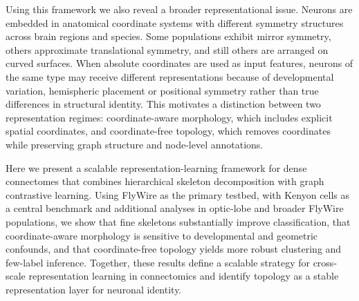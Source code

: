 \documentclass{article}
\begin{document}
Using this framework we also reveal a broader representational issue. Neurons are embedded in anatomical coordinate systems with different symmetry structures across brain regions and species. Some populations exhibit mirror symmetry, others approximate translational symmetry, and still others are arranged on curved surfaces. When absolute coordinates are used as input features, neurons of the same type may receive different representations because of developmental variation, hemispheric placement or positional symmetry rather than true differences in structural identity. This motivates a distinction between two representation regimes: coordinate-aware morphology, which includes explicit spatial coordinates, and coordinate-free topology, which removes coordinates while preserving graph structure and node-level annotations.


Here we present a scalable representation-learning framework for dense connectomes that combines hierarchical skeleton decomposition with graph contrastive learning. Using FlyWire as the primary testbed, with Kenyon cells as a central benchmark and additional analyses in optic-lobe and broader FlyWire populations, we show that fine skeletons substantially improve classification, that coordinate-aware morphology is sensitive to developmental and geometric confounds, and that coordinate-free topology yields more robust clustering and few-label inference. Together, these results define a scalable strategy for cross-scale representation learning in connectomics and identify topology as a stable representation layer for neuronal identity.
\end{document}
